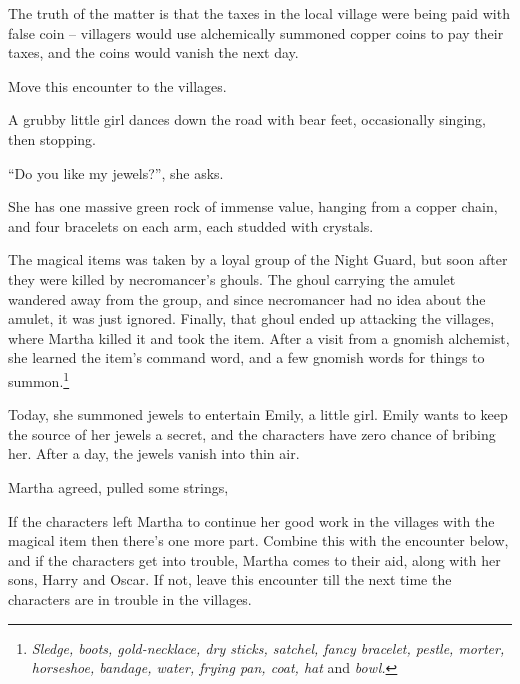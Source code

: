 \begin{multicols}{2}
The truth of the matter is that the taxes in the local village were being paid with false coin -- villagers would use alchemically summoned copper coins to pay their taxes, and the coins would vanish the next day.


\humanthief


\humanthief

Move this encounter to the villages.


\begin{boxtext}
	A grubby little girl dances down the road with bear feet, occasionally singing, then stopping.

		``Do you like my jewels?'', she asks.

	She has one massive green rock of immense value, hanging from a copper chain, and four bracelets on each arm, each studded with crystals.
\end{boxtext}

The magical items was taken by a loyal group of the Night Guard, but soon after they were killed by \gls{necromancer}'s ghouls.
The ghoul carrying the amulet wandered away from the group, and since \gls{necromancer} had no idea about the amulet, it was just ignored.
Finally, that ghoul ended up attacking the villages, where Martha killed it and took the item.
After a visit from a gnomish alchemist, she learned the item's command word, and a few gnomish words for things to summon.\footnote{\textit{Sledge, boots, gold-necklace, dry sticks, satchel, fancy bracelet, pestle, morter, horseshoe, bandage, water, frying pan, coat, hat} and \textit{bowl.}}

Today, she summoned jewels to entertain Emily, a little girl.
Emily wants to keep the source of her jewels a secret, and the characters have zero chance of bribing her.
After a day, the jewels vanish into thin air.

Martha agreed, pulled some strings, 




If the characters left Martha to continue her good work in the villages with the magical item then there's one more part.
Combine this with the encounter below, and if the characters get into trouble, Martha comes to their aid, along with her sons, Harry and Oscar.
If not, leave this encounter till the next time the characters are in trouble in the villages.


\end{multicols}
